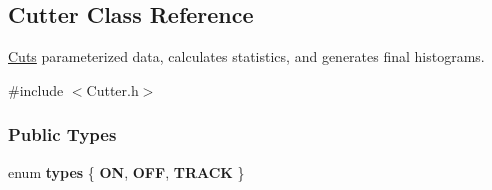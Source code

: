 \hypertarget{classCutter}{
\subsection{Cutter Class Reference}
\label{classCutter}
}


\hyperlink{namespaceCuts}{Cuts} parameterized data, calculates statistics, and generates final histograms.  




{\ttfamily \#include $<$Cutter.h$>$}

\subsubsection*{Public Types}
\begin{DoxyCompactItemize}
\item 
enum {\bfseries types} \{ {\bfseries ON}, 
{\bfseries OFF}, 
{\bfseries TRACK}
 \}
\end{DoxyCompactItemize}
